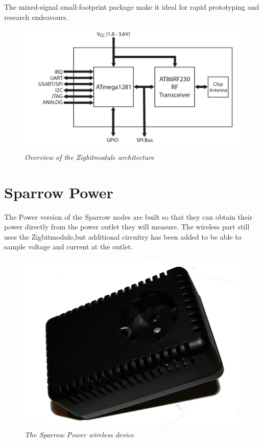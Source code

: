 The mixed-signal small-footprint package make it ideal for rapid prototyping and research endeavours.
\begin{figure}[ht]
\begin{center}
\includegraphics{hw_platform/zigbit.png}
\end{center}
\caption{\small \itshape{Overview of the Zigbit\texttrademark   module architecture}}
\end{figure}

\section{Sparrow Power}

The Power version of the Sparrow nodes are built so that they can obtain their power directly from the power outlet they will 
measure. The wireless part still uses the Zigbit\texttrademark module,but additional circuitry has been added to be able to 
sample voltage and current at the outlet.

\begin{figure}[ht]
\begin{center}
\includegraphics[scale=0.5]{hw_platform/sparrowpower1.png}
\end{center}
\caption{\small \itshape{The Sparrow Power wireless device}}
\end{figure}


